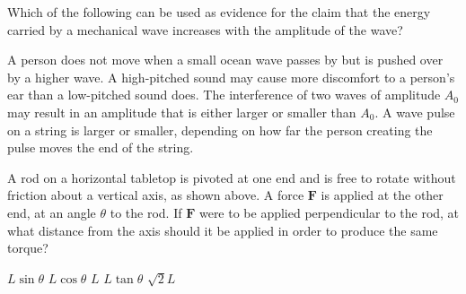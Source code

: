 \documentclass[12pt]{exam}
\begin{document}
\begin{questions}
    
  \question Which of the following can be used as evidence for the claim that
  the energy carried by a mechanical wave increases with the amplitude of the
  wave?
  \begin{choices}
    \choice A person does not move when a small ocean wave passes by but is
    pushed over by a higher wave.
    \choice A high-pitched sound may cause more discomfort to a person's ear
    than a low-pitched sound does.
    \choice The interference of two waves of amplitude $A_0$ may result in an
    amplitude that is either larger or smaller than $A_0$.
    \choice A wave pulse on a string is larger or smaller, depending on how far
    the person creating the pulse moves the end of the string.
  \end{choices}
  \vspace{.5in}
  
  \question A rod on a horizontal tabletop is pivoted at one end and is free to
  rotate without friction about a vertical axis, as shown above. A force
  $\bm{F}$ is applied at the other end, at an angle $\theta$ to the rod. If
  $\bm{F}$ were to be applied perpendicular to the rod, at what distance from
  the axis should it be applied in order to produce the same torque?
  \begin{choices}
    \choice$L\sin\theta$
    \choice$L\cos\theta$
    \choice$L$
    \choice$L\tan\theta$
    \choice$\sqrt{2}L$
  \end{choices}
  \newpage
  

\end{questions}
\end{document}
